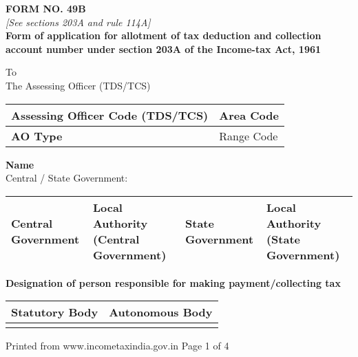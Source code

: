 \documentclass[11pt]{article}
\begin{document}
\pagestyle{empty} %

\noindent
\textbf{FORM NO. 49B} \\
\textit{[See sections 203A and rule 114A]} \\
\textbf{Form of application for allotment of tax deduction and collection account number under section 203A of the Income-tax Act, 1961}

\vspace{5mm} %
\noindent
To \\
The Assessing Officer (TDS/TCS) \\
\vspace{5mm} %

\noindent
\begin{tabular}{|>{\bfseries}m{2.5in}|m{2.5in}|}
    \hline
    Assessing Officer Code (TDS/TCS) & Area Code \\
    \hline
    AO Type & Range Code \\
    \hline
\end{tabular}
\vspace{5mm}

\noindent
\textbf{Name} \\
\indent Central / State Government:  \\
\noindent
\begin{tabular}{|m{1.5in}|m{1.5in}|m{1.5in}|m{1.5in}|}
    \hline
    \rowcolor{cellgray} Central Government & Local Authority (Central Government) & State Government & Local Authority (State Government) \\
    \hline
\end{tabular}

\vspace{5mm}
\noindent
\textbf{Designation of person responsible for making payment/collecting tax} \\
\noindent
\begin{tabular}{|m{1.5in}|m{1.5in}|}
    \hline
    \rowcolor{cellgray} Statutory Body & Autonomous Body \\
    \hline
    \multicolumn{2}{|c|}{\cellcolor{white}} \\
    \hline
\end{tabular}

\vspace{5mm}

\vfill
\noindent
Printed from www.incometaxindia.gov.in \hfill Page 1 of 4
\end{document}
